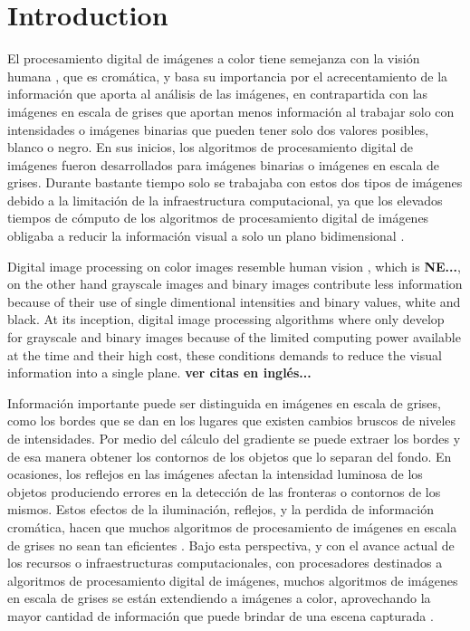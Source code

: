 \section{Introduction}
\label{intro}
El procesamiento digital de im\'agenes a color tiene semejanza con la visi\'on humana \cite{roerdink2000watershed}, que es crom\'atica, y basa su importancia por el acrecentamiento de la informaci\'on que aporta al an\'alisis de las im\'agenes, en contrapartida con las im\'agenes en escala de grises que aportan menos informaci\'on al trabajar solo con intensidades o im\'agenes binarias que pueden tener solo dos valores posibles, blanco o negro. En sus inicios, los algoritmos de procesamiento digital de im\'agenes fueron desarrollados para im\'agenes binarias o im\'agenes en escala de grises. Durante bastante tiempo solo se trabajaba con estos dos tipos de im\'agenes debido a la limitaci\'on de la infraestructura computacional, ya que los elevados tiempos de c\'omputo de los algoritmos de procesamiento digital de im\'agenes obligaba a reducir la informaci\'on visual a solo un plano bidimensional \cite{ortiz2002procesamiento}.

Digital image processing on color images resemble human vision \cite{roerdink2000watershed}, which is \textbf{NE...}, on the other hand grayscale images and binary images contribute less information because of their use of single dimentional intensities and binary values, white and black. At its inception, digital image processing algorithms where only develop for grayscale and binary images because of the limited computing power available at the time and their high cost, these conditions demands to reduce the visual information into a single plane.
\textbf{ver citas en inglés...}

Informaci\'on importante puede ser distinguida en im\'agenes en escala de grises, como los bordes que se dan en los lugares que existen cambios bruscos de niveles de intensidades. Por medio del c\'alculo del gradiente se puede extraer los bordes y de esa manera obtener los contornos de los objetos que lo separan del fondo. En ocasiones, los reflejos en las im\'agenes afectan la intensidad luminosa de los objetos produciendo errores en la detecci\'on de las fronteras o contornos de los mismos. Estos efectos de la iluminaci\'on, reflejos, y la perdida de informaci\'on crom\'atica, hacen que muchos algoritmos de procesamiento de im\'agenes en escala  de grises no sean tan eficientes \cite{ortiz2002procesamiento}. Bajo esta perspectiva, 	y con el avance actual de los recursos o infraestructuras computacionales, con procesadores destinados a algoritmos de procesamiento digital de im\'agenes, muchos algoritmos de im\'agenes en escala de grises se est\'an extendiendo a im\'agenes a color, aprovechando la mayor cantidad de informaci\'on que puede brindar de una escena capturada \cite{ortiz2002procesamiento}.


